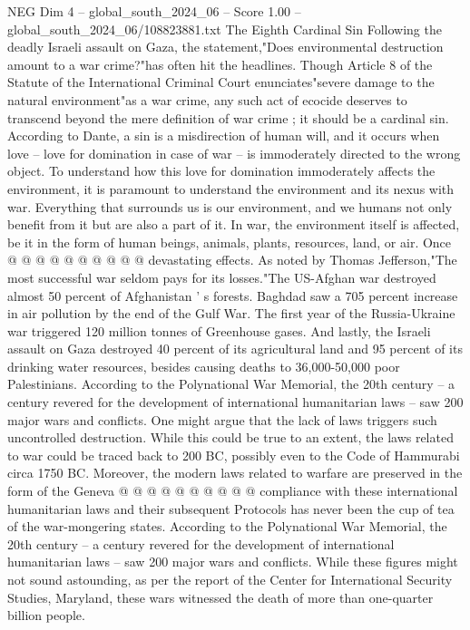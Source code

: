 \begin{textsample}{NEG Dim 4 – global\_south\_2024\_06 – Score 1.00 – global\_south\_2024\_06/108823881.txt}  \label{ex:f4_neg_376}
The Eighth Cardinal Sin Following the deadly Israeli assault on Gaza, the statement,"Does environmental destruction amount to a war crime?"has often hit the headlines.
Though Article 8 of the Statute of the International Criminal Court enunciates"severe damage to the natural environment"as a war crime, any such act of ecocide deserves to transcend beyond the mere definition of war crime ; it should be a cardinal sin.
According to Dante, a sin is a misdirection of human will, and it occurs when love -- love for domination in case of war -- is immoderately directed to the wrong object.
To understand how this love for domination immoderately affects the environment, it is paramount to understand the environment and its nexus with war.
Everything that surrounds us is our environment, and we humans not only benefit from it but are also a part of it.
In war, the environment itself is affected, be it in the form of human beings, animals, plants, resources, land, or air.
Once @ @ @ @ @ @ @ @ @ @ devastating effects.
As noted by Thomas Jefferson,"The most successful war seldom pays for its losses."The US-Afghan war destroyed almost 50 percent of Afghanistan ' s forests.
Baghdad saw a 705 percent increase in air pollution by the end of the Gulf War.
The first year of the Russia-Ukraine war triggered 120 million tonnes of Greenhouse gases.
And lastly, the Israeli assault on Gaza destroyed 40 percent of its agricultural land and 95 percent of its drinking water resources, besides causing deaths to 36,000-50,000 poor Palestinians.
According to the Polynational War Memorial, the 20th century -- a century revered for the development of international humanitarian laws -- saw 200 major wars and conflicts.
One might argue that the lack of laws triggers such uncontrolled destruction.
While this could be true to an extent, the laws related to war could be traced back to 200 BC, possibly even to the Code of Hammurabi circa 1750 BC.
Moreover, the modern laws related to warfare are preserved in the form of the Geneva @ @ @ @ @ @ @ @ @ @ compliance with these international humanitarian laws and their subsequent Protocols has never been the cup of tea of the war-mongering states.
According to the Polynational War Memorial, the 20th century -- a century revered for the development of international humanitarian laws -- saw 200 major wars and conflicts.
While these figures might not sound astounding, as per the report of the Center for International Security Studies, Maryland, these wars witnessed the death of more than one-quarter billion people.

\end{textsample}
